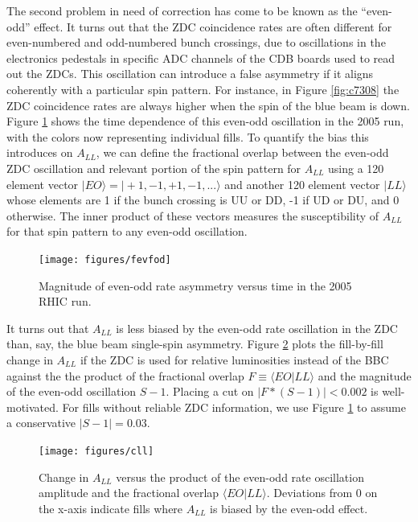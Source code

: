 
The second problem in need of correction has come to be known as the
``even-odd'' effect. It turns out that the ZDC coincidence rates are often
different for even-numbered and odd-numbered bunch crossings, due to
oscillations in the electronics pedestals in specific ADC channels of the CDB
boards used to read out the ZDCs. This oscillation can introduce a false
asymmetry if it aligns coherently with a particular spin pattern. For instance,
in Figure \ref{fig:c7308} the ZDC coincidence rates are always higher when the
spin of the blue beam is down. Figure \ref{fig:fevfod} shows the time dependence
of this even-odd oscillation in the 2005 run, with the colors now representing
individual fills. To quantify the bias this introduces on $A_{LL}$, we can
define the fractional overlap between the even-odd ZDC oscillation and relevant
portion of the spin pattern for $A_{LL}$ using a 120 element vector $|EO\rangle
= |+1,-1,+1,-1,...\rangle$ and another 120 element vector $|LL\rangle$ whose
elements are 1 if the bunch crossing is UU or DD, -1 if UD or DU, and 0
otherwise. The inner product of these vectors measures the susceptibility of
$A_{LL}$ for that spin pattern to any even-odd oscillation.

\begin{figure}
  \texttt{[image: figures/fevfod]}
  \caption{Magnitude of even-odd rate asymmetry versus time in the 2005 RHIC run.}
  \label{fig:fevfod}
\end{figure}

It turns out that $A_{LL}$ is less biased by the even-odd rate oscillation in
the ZDC than, say, the blue beam single-spin asymmetry. Figure \ref{fig:cll}
plots the fill-by-fill change in $A_{LL}$ if the ZDC is used for relative
luminosities instead of the BBC against the the product of the fractional
overlap $F \equiv \langle EO | LL \rangle$ and the magnitude of the even-odd
oscillation $S-1$. Placing a cut on $|F*(S-1)| < 0.002$ is well-motivated. For
fills without reliable ZDC information, we use Figure \ref{fig:fevfod} to
assume a conservative $|S-1| = 0.03$.

\begin{figure}
  \begin{center}
  \texttt{[image: figures/cll]}
  \end{center}
  \caption{Change in $A_{LL}$ versus the product of the even-odd rate oscillation amplitude and the fractional overlap $\langle EO | LL \rangle$.  Deviations from 0 on the x-axis indicate fills where $A_{LL}$ is biased by the even-odd effect.}
  \label{fig:cll}
\end{figure}

